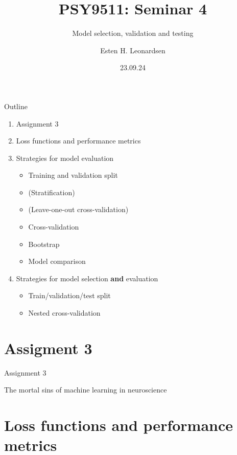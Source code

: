 \documentclass[10pt]{beamer}
\title{PSY9511: Seminar 4}
\subtitle{Model selection, validation and testing}
\author{Esten H. Leonardsen}
\date{23.09.24}
\begin{document}
	\begin{frame}
	 	\titlepage
	\end{frame}

    \begin{frame}{Outline}
        \begin{enumerate}
            \item Assignment 3
            \item Loss functions and performance metrics
            \item Strategies for model evaluation
            \begin{itemize}
                \item Training and validation split
                \item (Stratification)
                \item (Leave-one-out cross-validation)
                \item Cross-validation
                \item Bootstrap
                \item Model comparison
            \end{itemize}
            \item Strategies for model selection \textbf{and} evaluation
            \begin{itemize}
                \item Train/validation/test split
                \item Nested cross-validation
            \end{itemize}
        \end{enumerate}
    \end{frame}

    \section{Assigment 3}

    \begin{frame}{Assignment 3}
    \end{frame}

    \begin{frame}{The mortal sins of machine learning in neuroscience}

    \end{frame}

    \section{Loss functions and performance metrics}
\end{document}
